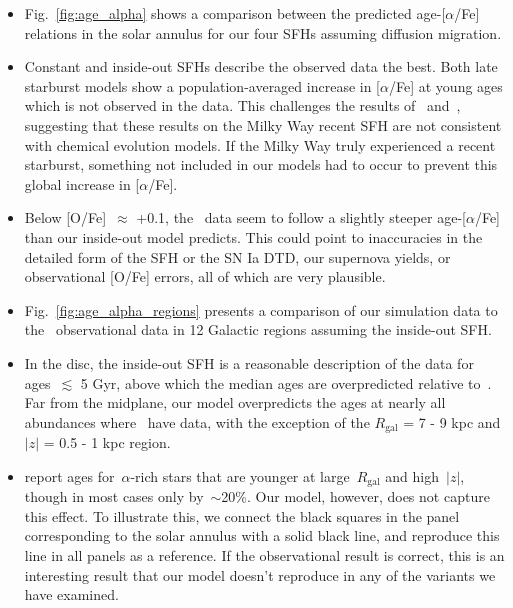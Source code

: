 \documentclass[fleqn, usenatbib]{mnras}
\begin{document}
\begin{itemize}
	\item Fig.~\ref{fig:age_alpha} shows a comparison between 
	the predicted age-[$\alpha$/Fe] relations in the solar annulus for our 
	four SFHs assuming diffusion migration. 

	\item Constant and inside-out SFHs describe the observed data the best. 
	Both late starburst models show a population-averaged increase in 
	[$\alpha$/Fe] at young ages which is not observed in the data. This 
	challenges the results of~\citet{Isern2019} and~\citet{Mor2019}, 
	suggesting that these results on the Milky Way recent SFH are not 
	consistent with chemical evolution models. If the Milky Way truly 
	experienced a recent starburst, something not included in our models had 
	to occur to prevent this global increase in [$\alpha$/Fe]. 

	\item Below [O/Fe]~$\approx$ +0.1, the~\citet{Feuillet2019} data seem to 
	follow a slightly steeper age-[$\alpha$/Fe] than our inside-out model 
	predicts. This could point to inaccuracies in the detailed form of the SFH 
	or the SN Ia DTD, our supernova yields, or observational [O/Fe] errors, all 
	of which are very plausible. 

	\item Fig.~\ref{fig:age_alpha_regions} presents a comparison of our 
	simulation data to the~\citet{Feuillet2019} observational data in 12 
	Galactic regions assuming the inside-out SFH. 

	\item In the disc, the inside-out SFH is a reasonable description of the 
	data for ages~$\lesssim$ 5 Gyr, above which the median ages are 
	overpredicted relative to~\citet{Feuillet2019}. Far from the midplane, our 
	model overpredicts the ages at nearly all abundances 
	where~\citet{Feuillet2019} have data, with the exception of the 
	$R_\text{gal}$ = 7 - 9 kpc and $\left|z\right|$ = 0.5 - 1 kpc region. 

	\item \citet{Feuillet2019} report ages for~$\alpha$-rich stars that are 
	younger at large~$R_\text{gal}$ and high~$\left|z\right|$, though in most 
	cases only by~$\sim$20\%. Our model, however, does not capture this effect. 
	To illustrate this, we connect the black squares in the panel corresponding 
	to the solar annulus with a solid black line, and reproduce this line in 
	all panels as a reference. If the observational result is correct, this is 
	an interesting result that our model doesn't reproduce in any of the 
	variants we have examined. 


\end{itemize}
\end{document}
